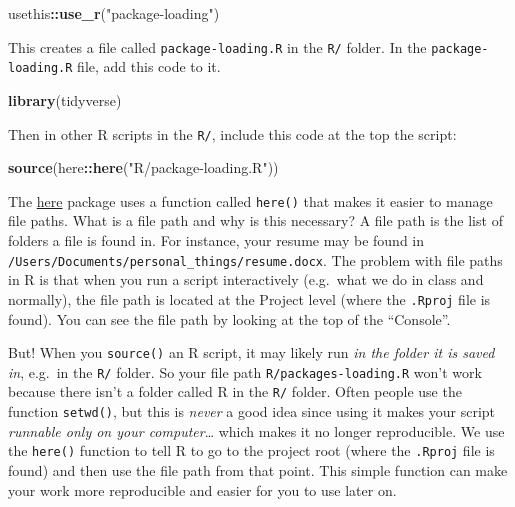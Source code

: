 \documentclass[]{Nemilov}
\newenvironment{Shaded}{\begin{snugshade}}{\end{snugshade}}
\newcommand{\KeywordTok}[1]{\textcolor[rgb]{0.13,0.29,0.53}{\textbf{#1}}}
\newcommand{\NormalTok}[1]{#1}
\newcommand{\OperatorTok}[1]{\textcolor[rgb]{0.81,0.36,0.00}{\textbf{#1}}}
\newcommand{\StringTok}[1]{\textcolor[rgb]{0.31,0.60,0.02}{#1}}
\begin{document}
\begin{Shaded}
\begin{Highlighting}[]
\NormalTok{usethis}\OperatorTok{::}\KeywordTok{use_r}\NormalTok{(}\StringTok{"package-loading"}\NormalTok{)}
\end{Highlighting}
\end{Shaded}

This creates a file called \texttt{package-loading.R} in the \texttt{R/} folder. In the
\texttt{package-loading.R} file, add this code to it.

\begin{Shaded}
\begin{Highlighting}[]
\KeywordTok{library}\NormalTok{(tidyverse)}
\end{Highlighting}
\end{Shaded}

Then in other R scripts in the \texttt{R/}, include this code at the top the script:

\begin{Shaded}
\begin{Highlighting}[]
\KeywordTok{source}\NormalTok{(here}\OperatorTok{::}\KeywordTok{here}\NormalTok{(}\StringTok{"R/package-loading.R"}\NormalTok{))}
\end{Highlighting}
\end{Shaded}

The \href{https://here.r-lib.org/}{here} package uses a function
called \texttt{here()} that makes it easier to manage file paths. What is a file path
and why is this necessary? A file path is the list of folders a file is found
in. For instance, your resume may be found in
\texttt{/Users/Documents/personal\_things/resume.docx}. The problem with file paths in R
is that when you run a script interactively (e.g.~what we do in class and
normally), the file path is located at the Project level (where the \texttt{.Rproj}
file is found). You can see the file path by looking at the top of the
``Console''.

But! When you \texttt{source()} an R script, it may likely run \emph{in the
folder it is saved in}, e.g.~in the \texttt{R/} folder. So your file path
\texttt{R/packages-loading.R} won't work because there isn't a folder called R in the
\texttt{R/} folder. Often people use the function \texttt{setwd()}, but this is \emph{never} a good
idea since using it makes your script \emph{runnable only on your computer}\ldots{} which
makes it no longer reproducible. We use the \texttt{here()} function to tell R to go
to the project root (where the \texttt{.Rproj} file is found) and then use the file
path from that point. This simple function can make your work more reproducible
and easier for you to use later on.
\end{document}
